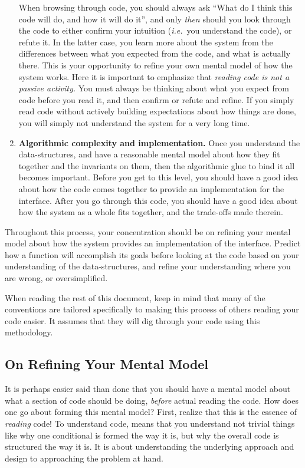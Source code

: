 \documentclass[11pt,onecolumn]{article}
\def\ie{\textit{i.e.}}
\newcommand{\lsthead}[1]{{\bf #1}}
\begin{document}
\begin{enumerate}[itemsep=0pt,topsep=1pt,parsep=1pt,leftmargin=2.5em]
  When browsing through code, you should always ask ``What do I think
  this code will do, and how it will do it'', and only {\em then}
  should you look through the code to either confirm your intuition
  (\ie\ you understand the code), or refute it.  In the latter case,
  you learn more about the system from the differences between what
  you expected from the code, and what is actually there.  This is
  your opportunity to refine your own mental model of how the system
  works.  Here it is important to emphasize that {\em reading code is
    not a passive activity.}  You must always be thinking about what
  you expect from code before you read it, and then confirm or refute
  and refine.  If you simply read code without actively building
  expectations about how things are done, you will simply not
  understand the system for a very long time.
\item \lsthead{Algorithmic complexity and implementation.} Once you
  understand the data-structures, and have a reasonable mental model
  about how they fit together and the invariants on them, then the
  algorithmic glue to bind it all becomes important.  Before you get
  to this level, you should have a good idea about how the code comes
  together to provide an implementation for the interface.  After you
  go through this code, you should have a good idea about how the
  system as a whole fits together, and the trade-offs made therein.
\end{enumerate}

Throughout this process, your concentration should be on refining your
mental model about how the system provides an implementation of the
interface.  Predict how a function will accomplish its goals before
looking at the code based on your understanding of the
data-structures, and refine your understanding where you are wrong, or
oversimplified.

When reading the rest of this document, keep in mind that many of the
conventions are tailored specifically to making this process of others
reading your code easier.  It assumes that they will dig through your
code using this methodology.

\subsection{On Refining Your Mental Model}

It is perhaps easier said than done that you should have a mental
model about what a section of code should be doing, {\em before}
actual reading the code.  How does one go about forming this mental
model?  First, realize that this is the essence of {\em reading} code!
To understand code, means that you understand not trivial things like
why one conditional is formed the way it is, but why the overall code
is structured the way it is.  It is about understanding the underlying
approach and design to approaching the problem at hand.
\end{document}
